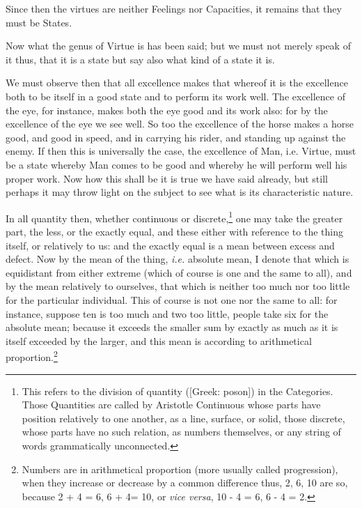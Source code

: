 Since then the virtues are neither Feelings nor Capacities, it remains that
they must be States.


Now what the genus of Virtue is has been said; but we must not merely speak of
it thus, that it is a state but say also what kind of a state it is.

We must observe then that all excellence makes that whereof it is the
excellence both to be itself in a good state and to perform its work well. The
excellence of the eye, for instance, makes both the eye good and its work also:
for by the excellence of the eye we see well. So too the excellence of the
horse makes a horse good, and good in speed, and in carrying his rider, and
standing up against the enemy. If then this is universally the case, the
excellence of Man, i.e. Virtue, must be a state whereby Man comes to be good
and whereby he will perform well his proper work. Now how this shall be it is
true we have said already, but still perhaps it may throw light on the subject
to see what is its characteristic nature.

In all quantity then, whether continuous or discrete,\footnote{This refers to the division of quantity ([Greek: poson]) in the Categories.
Those Quantities are called by Aristotle Continuous whose parts have position
relatively to one another, as a line, surface, or solid, those discrete, whose
parts have no such relation, as numbers themselves, or any string of words
grammatically unconnected.}
one may take the greater part, the less, or the exactly equal, and these either
with reference to the thing itself, or relatively to us: and the exactly equal
is a mean between excess and defect. Now by the mean of the thing, \emph{i.e.}
absolute mean, I denote that which is equidistant from either extreme (which of
course is one and the same to all), and by the mean relatively to ourselves,
that which is neither too much nor too little for the particular individual.
This of course is not one nor the same to all: for instance, suppose ten is too
much and two too little, people take six for the absolute mean; because it
exceeds the smaller sum by exactly as much as it is itself exceeded by the
larger, and this mean is according to arithmetical proportion.\footnote{Numbers are in arithmetical proportion (more usually called progression), when
they increase or decrease by a common difference thus, 2, 6, 10 are so, because
2 + 4 = 6, 6 + 4= 10, or \emph{vice versa}, 10 - 4 = 6, 6 - 4 = 2.}

